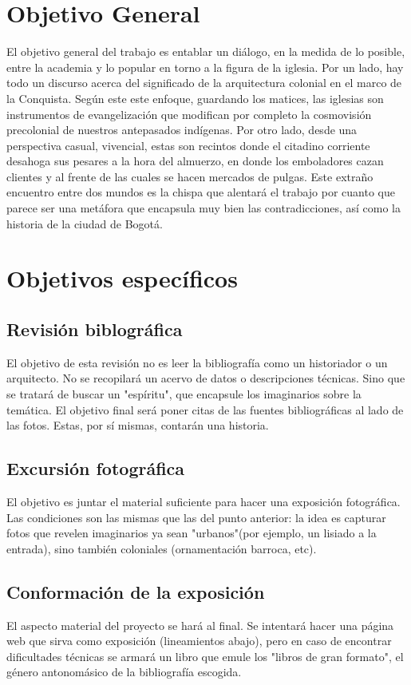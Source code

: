 \documentclass[11pt]{article}
\begin{document}
\section{Objetivo General}
\label{sec-2}
El objetivo general del trabajo es entablar un diálogo, en la medida de lo posible, entre la academia y lo popular en
torno a la figura de la iglesia. Por un lado, hay todo un discurso acerca del significado de la arquitectura colonial
en el marco de la Conquista. Según este este enfoque, guardando los matices, las iglesias son instrumentos 
de evangelización que modifican por completo la cosmovisión precolonial de nuestros antepasados indígenas. Por otro lado,
desde una perspectiva casual, vivencial, estas son recintos donde el citadino corriente desahoga sus pesares a la hora del almuerzo,
en donde los emboladores cazan clientes y al frente de las cuales se hacen mercados de pulgas. Este extraño encuentro entre 
dos mundos es la chispa que alentará el trabajo por cuanto que parece ser una metáfora que encapsula muy bien las contradicciones,
así como la historia de la ciudad de Bogotá.

\section{Objetivos específicos}
\label{sec-3}
\subsection{Revisión biblográfica}
\label{sec-3-1}
El objetivo de esta revisión no es leer la bibliografía como un historiador o un arquitecto.
No se recopilará un acervo de datos o descripciones técnicas. Sino que se tratará de buscar un "espíritu",
que encapsule los imaginarios sobre la temática. El objetivo final será poner citas de las fuentes bibliográficas al lado de las fotos. Estas, por sí mismas, contarán una historia. 
\subsection{Excursión fotográfica}
\label{sec-3-2}
El objetivo es juntar el material suficiente para hacer una exposición fotográfica. Las condiciones son las mismas que las del punto anterior: la idea es capturar fotos que revelen imaginarios ya sean "urbanos"(por ejemplo, un lisiado a la entrada), sino también coloniales (ornamentación barroca, etc).

\subsection{Conformación de la exposición}
\label{sec-3-3}
El aspecto material del proyecto se hará al final. Se intentará hacer una página web que sirva como exposición (lineamientos abajo),
 pero en caso de encontrar dificultades técnicas se armará un libro que emule los "libros de gran formato", el género antonomásico de la bibliografía escogida.
\end{document}
